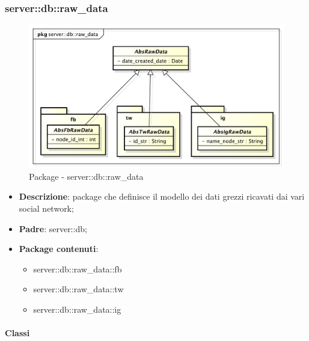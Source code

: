\subsubsection{server::db::raw\_data} %
\label{ssub:bdsm_app_server_raw_data}
	\begin{figure}[htbp]
		\centering
		\centerline{\includegraphics[scale=0.4]{./images/server/raw_data.pdf}}
		\caption{Package - server::db::raw\_data}
	\end{figure}

	\begin{itemize}
	\item \textbf{Descrizione}: package che definisce il modello dei dati grezzi ricavati dai vari social network;
		\item \textbf{Padre}: server::db;
		\item \textbf{Package contenuti}:
			\begin{itemize}
				\item server::db::raw\_data::fb
				\item server::db::raw\_data::tw
				\item server::db::raw\_data::ig
		\end{itemize}
	\end{itemize}


	\paragraph{Classi} %

